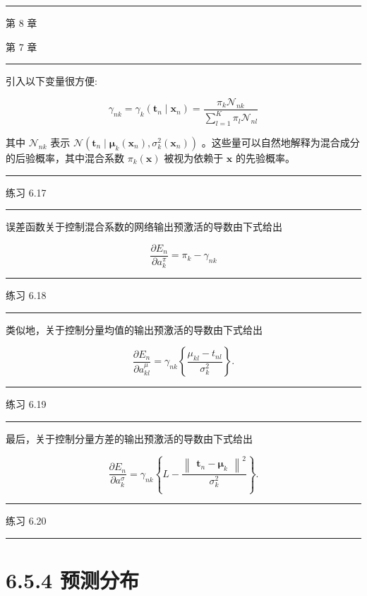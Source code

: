 \documentclass[10pt]{report}
\newcommand{\HRule}{\begin{center}\rule{0.9\linewidth}{0.2mm}\end{center}}
\begin{document}
\HRule

第 8 章

第 7 章

\HRule

引入以下变量很方便:

\[
{\gamma }_{nk} = {\gamma }_{k}\left( {{\mathbf{t}}_{n} \mid  {\mathbf{x}}_{n}}\right)  = \frac{{\pi }_{k}{\mathcal{N}}_{nk}}{\mathop{\sum }\limits_{{l = 1}}^{K}{\pi }_{l}{\mathcal{N}}_{nl}} \tag{6.44}
\]

其中 \({\mathcal{N}}_{nk}\) 表示 \(\mathcal{N}\left( {{\mathbf{t}}_{n} \mid  {\mathbf{\mu }}_{k}\left( {\mathbf{x}}_{n}\right) ,{\sigma }_{k}^{2}\left( {\mathbf{x}}_{n}\right) }\right)\) 。这些量可以自然地解释为混合成分的后验概率，其中混合系数 \({\pi }_{k}\left( \mathbf{x}\right)\) 被视为依赖于 \(\mathbf{x}\) 的先验概率。

\HRule

练习 6.17

\HRule

误差函数关于控制混合系数的网络输出预激活的导数由下式给出

\[
\frac{\partial {E}_{n}}{\partial {a}_{k}^{\pi }} = {\pi }_{k} - {\gamma }_{nk} \tag{6.45}
\]

\HRule

练习 6.18

\HRule

类似地，关于控制分量均值的输出预激活的导数由下式给出

\[
\frac{\partial {E}_{n}}{\partial {a}_{kl}^{\mu }} = {\gamma }_{nk}\left\{  \frac{{\mu }_{kl} - {t}_{nl}}{{\sigma }_{k}^{2}}\right\}  . \tag{6.46}
\]

\HRule

练习 6.19

\HRule

最后，关于控制分量方差的输出预激活的导数由下式给出

\[
\frac{\partial {E}_{n}}{\partial {a}_{k}^{\sigma }} = {\gamma }_{nk}\left\{  {L - \frac{{\begin{Vmatrix}{\mathbf{t}}_{n} - {\mathbf{\mu }}_{k}\end{Vmatrix}}^{2}}{{\sigma }_{k}^{2}}}\right\}  . \tag{6.47}
\]

\HRule

练习 6.20

\HRule

\section*{6.5.4 预测分布}
\end{document}
